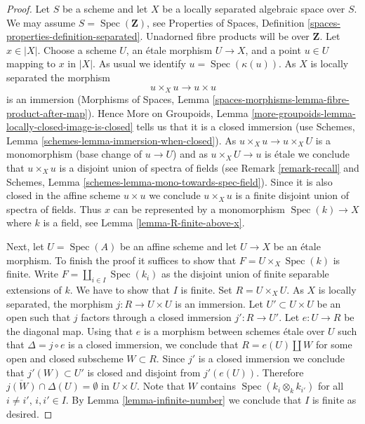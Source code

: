 \documentclass{stacks-project}
\theoremstyle{plain}
\theoremstyle{definition}
\theoremstyle{remark}
\numberwithin{equation}{subsection}
\def\Spec{\mathop{\mathrm{Spec}}}
\begin{document}
\begin{proof}
Let $S$ be a scheme and let $X$ be a locally separated algebraic space
over $S$. We may assume $S = \Spec(\mathbf{Z})$, see
Properties of Spaces, Definition \ref{spaces-properties-definition-separated}.
Unadorned fibre products will be over $\mathbf{Z}$.
Let $x \in |X|$. Choose a scheme $U$, an \'etale
morphism $U \to X$, and a point $u \in U$ mapping to $x$ in $|X|$.
As usual we identify $u = \Spec(\kappa(u))$.
As $X$ is locally separated the morphism
$$
u \times_X u \to u \times u
$$
is an immersion (Morphisms of Spaces, Lemma
\ref{spaces-morphisms-lemma-fibre-product-after-map}).
Hence More on Groupoids, Lemma
\ref{more-groupoids-lemma-locally-closed-image-is-closed}
tells us that it is a closed immersion (use
Schemes, Lemma \ref{schemes-lemma-immersion-when-closed}).
As $u \times_X u \to u \times_X U$ is a monomorphism (base change
of $u \to U$) and as $u \times_X U \to u$ is \'etale we conclude that
$u \times_X u$ is a disjoint union of spectra of fields
(see Remark \ref{remark-recall} and
Schemes, Lemma \ref{schemes-lemma-mono-towards-spec-field}).
Since it is also closed in the affine scheme $u \times u$ we
conclude $u \times_X u$ is a finite disjoint union of spectra of fields.
Thus $x$ can be represented by a monomorphism $\Spec(k) \to X$ where $k$
is a field, see
Lemma \ref{lemma-R-finite-above-x}.

\medskip\noindent
Next, let $U = \Spec(A)$ be an affine scheme and let $U \to X$ be an
\'etale morphism. To finish the proof it suffices to show that
$F = U \times_X \Spec(k)$ is finite. Write $F = \coprod_{i \in I} \Spec(k_i)$
as the disjoint union of finite separable extensions of $k$.
We have to show that $I$ is finite.
Set $R = U \times_X U$. As $X$ is locally separated, the morphism
$j : R \to U \times U$ is an immersion. Let $U' \subset U \times U$
be an open such that $j$ factors through a closed immersion $j' : R \to U'$.
Let $e : U \to R$ be the diagonal map. Using that $e$ is a morphism between
schemes \'etale over $U$ such that $\Delta = j \circ e$ is a
closed immersion, we conclude that $R = e(U) \amalg W$ for some
open and closed subscheme $W \subset R$. Since $j'$ is a closed immersion
we conclude that $j'(W) \subset U'$ is closed and disjoint from
$j'(e(U))$. Therefore
$\overline{j(W)} \cap \Delta(U) = \emptyset$ in $U \times U$.
Note that $W$ contains $\Spec(k_i \otimes_k k_{i'})$ for all
$i \not = i'$, $i, i' \in I$. By Lemma \ref{lemma-infinite-number}
we conclude that $I$ is finite as desired.
\end{proof}
\end{document}
